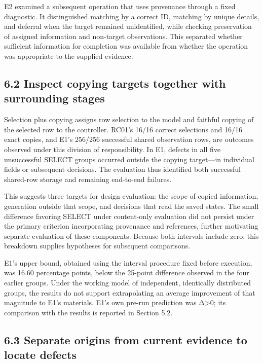\documentclass[10pt,a4paper]{article}
\begin{document}
E2 examined a subsequent operation that uses provenance through a fixed diagnostic. It distinguished matching by a correct ID, matching by unique details, and deferral when the target remained unidentified, while checking preservation of assigned information and non-target observations. This separated whether sufficient information for completion was available from whether the operation was appropriate to the supplied evidence.

\subsection{6.2 Inspect copying targets together with surrounding stages}\label{paper-01-inspect-copying-targets-together-with-surrounding-stages}

Selection plus copying assigns row selection to the model and faithful copying of the selected row to the controller. RC01's 16/16 correct selections and 16/16 exact copies, and E1's 256/256 successful shared observation rows, are outcomes observed under this division of responsibility. In E1, defects in all five unsuccessful SELECT groups occurred outside the copying target---in individual fields or subsequent decisions. The evaluation thus identified both successful shared-row storage and remaining end-to-end failures.

This suggests three targets for design evaluation: the scope of copied information, generation outside that scope, and decisions that read the saved states. The small difference favoring SELECT under content-only evaluation did not persist under the primary criterion incorporating provenance and references, further motivating separate evaluation of these components. Because both intervals include zero, this breakdown supplies hypotheses for subsequent comparisons.

E1's upper bound, obtained using the interval procedure fixed before execution, was 16.60 percentage points, below the 25-point difference observed in the four earlier groups. Under the working model of independent, identically distributed groups, the results do not support extrapolating an average improvement of that magnitude to E1's materials. E1's own pre-run prediction was Δ\textgreater0; its comparison with the results is reported in Section 5.2.

\subsection{6.3 Separate origins from current evidence to locate defects}\label{paper-01-separate-origins-from-current-evidence-to-locate-defects}
\end{document}
